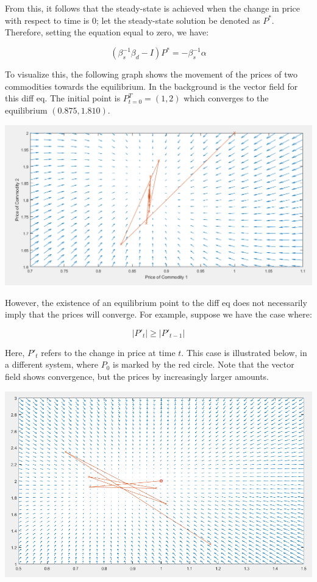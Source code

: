 \documentclass[12pt]{article}
\begin{document}
From this, it follows that the steady-state is achieved when the change in price with respect to time is 0; let the steady-state solution be denoted as $P^*$. Therefore, setting the equation equal to zero, we have:

$$(\beta_s^{-1} \beta_d - I) P^* = -\beta_s^{-1} \alpha$$

To visualize this, the following graph shows the movement of the prices of two commodities towards the equilibrium. In the background is the vector field for this diff eq. The initial point is $P_{t=0}^T = (1,2)$ which converges to the equilibrium $(0.875,1.810)$.

\begin{center}
	\includegraphics[scale = 0.5]{figures/vector_field}
\end{center}

However, the existence of an equilibrium point to the diff eq does not necessarily imply that the prices will converge. For example, suppose we have the case where:

$$| P'_t | \geq | P'_{t-1} | $$

Here, $P'_t$ refers to the change in price at time $t$. This case is illustrated below, in a different system, where $P_0$ is marked by the red circle. Note that the vector field shows convergence, but the prices by increasingly larger amounts. 

\begin{center}
	\includegraphics[scale = 0.5]{figures/vector_field2}
\end{center}
\end{document}
